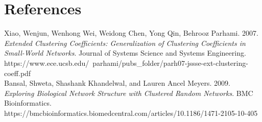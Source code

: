 \documentclass{article}
\begin{document}
\section{References}
Xiao, Wenjun, Wenhong Wei, Weidong Chen, Yong Qin, Behrooz Parhami. 2007.
\textit{Extended Clustering Coefficients: Generalization of Clustering Coefficients in Small-World
Networks}. Journal of Systems Science and Systems Engineering. https://www.ece.ucsb.edu/~parhami/pubs\_folder/parh07-jssse-ext-clustering-coeff.pdf\\

Bansal, Shweta, Shashank Khandelwal, and Lauren Ancel Meyers. 2009. \textit{Exploring Biological Network Structure with Clustered Random Networks}.
BMC Bioinformatics. https://bmcbioinformatics.biomedcentral.com/articles/10.1186/1471-2105-10-405
\end{document}
